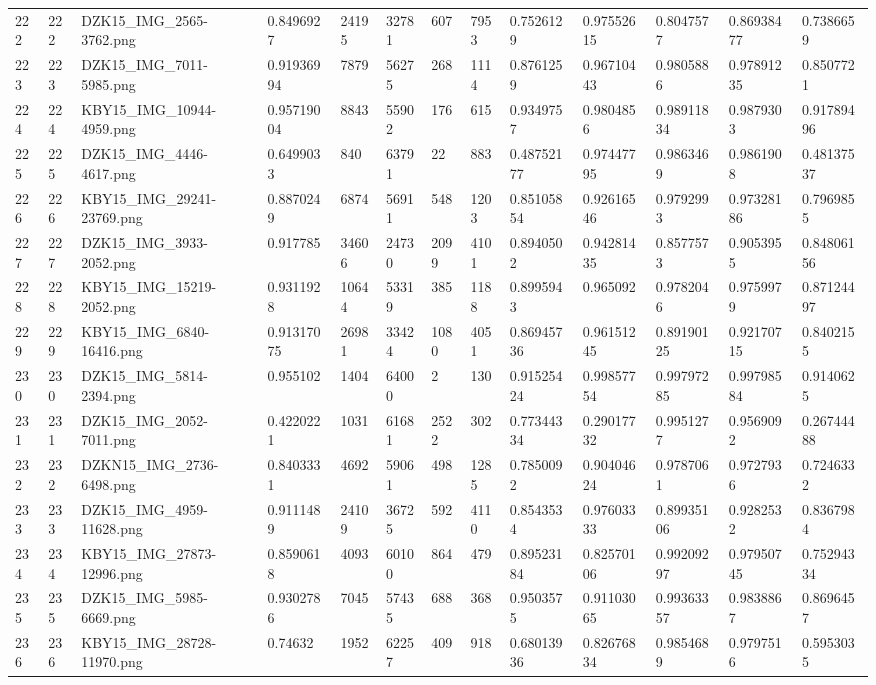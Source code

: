 \documentclass[11pt, a4paper, twoside]{report}
\begin{document}
\begin{longtable}[c]{@{}lllllllllllll@{}}
222 & 222 & DZK15\_IMG\_2565-3762.png & 0.8496927 & 24195 & 32781 & 607 & 7953 & 0.7526129 & 0.97552615 & 0.8047577 & 0.86938477 & 0.7386659 \\
223 & 223 & DZK15\_IMG\_7011-5985.png & 0.91936994 & 7879 & 56275 & 268 & 1114 & 0.8761259 & 0.96710443 & 0.9805886 & 0.97891235 & 0.8507721 \\
224 & 224 & KBY15\_IMG\_10944-4959.png & 0.95719004 & 8843 & 55902 & 176 & 615 & 0.9349757 & 0.9804856 & 0.98911834 & 0.9879303 & 0.91789496 \\
225 & 225 & DZK15\_IMG\_4446-4617.png & 0.6499033 & 840 & 63791 & 22 & 883 & 0.48752177 & 0.97447795 & 0.9863469 & 0.9861908 & 0.48137537 \\
226 & 226 & KBY15\_IMG\_29241-23769.png & 0.8870249 & 6874 & 56911 & 548 & 1203 & 0.85105854 & 0.92616546 & 0.9792993 & 0.97328186 & 0.7969855 \\
227 & 227 & DZK15\_IMG\_3933-2052.png & 0.917785 & 34606 & 24730 & 2099 & 4101 & 0.8940502 & 0.94281435 & 0.8577573 & 0.9053955 & 0.84806156 \\
228 & 228 & KBY15\_IMG\_15219-2052.png & 0.9311928 & 10644 & 53319 & 385 & 1188 & 0.8995943 & 0.965092 & 0.9782046 & 0.9759979 & 0.87124497 \\
229 & 229 & KBY15\_IMG\_6840-16416.png & 0.91317075 & 26981 & 33424 & 1080 & 4051 & 0.86945736 & 0.96151245 & 0.89190125 & 0.92170715 & 0.8402155 \\
230 & 230 & DZK15\_IMG\_5814-2394.png & 0.955102 & 1404 & 64000 & 2 & 130 & 0.91525424 & 0.99857754 & 0.99797285 & 0.99798584 & 0.9140625 \\
231 & 231 & DZK15\_IMG\_2052-7011.png & 0.4220221 & 1031 & 61681 & 2522 & 302 & 0.77344334 & 0.29017732 & 0.9951277 & 0.9569092 & 0.26744488 \\
232 & 232 & DZKN15\_IMG\_2736-6498.png & 0.8403331 & 4692 & 59061 & 498 & 1285 & 0.7850092 & 0.90404624 & 0.9787061 & 0.9727936 & 0.7246332 \\
233 & 233 & DZK15\_IMG\_4959-11628.png & 0.9111489 & 24109 & 36725 & 592 & 4110 & 0.8543534 & 0.97603333 & 0.89935106 & 0.9282532 & 0.8367984 \\
234 & 234 & KBY15\_IMG\_27873-12996.png & 0.8590618 & 4093 & 60100 & 864 & 479 & 0.89523184 & 0.82570106 & 0.99209297 & 0.97950745 & 0.75294334 \\
235 & 235 & DZK15\_IMG\_5985-6669.png & 0.9302786 & 7045 & 57435 & 688 & 368 & 0.9503575 & 0.91103065 & 0.99363357 & 0.9838867 & 0.8696457 \\
236 & 236 & KBY15\_IMG\_28728-11970.png & 0.74632 & 1952 & 62257 & 409 & 918 & 0.68013936 & 0.82676834 & 0.9854689 & 0.9797516 & 0.5953035 \\

\end{longtable}
\end{document}
